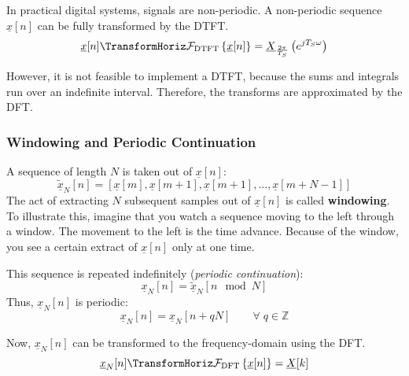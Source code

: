 \begin{refsection}
In practical digital systems, signals are non-periodic. A non-periodic sequence $\underline{x}[n]$ can be fully transformed by the \ac{DTFT}.
\begin{equation}
	\underline{x}[n] \TransformHoriz \mathcal{F}_{\text{DTFT}}\left\{\underline{x}[n]\right\} = \underline{X}_{\frac{2\pi}{T_S}}\left(e^{j T_S \omega}\right)
\end{equation}

However, it is not feasible to implement a \ac{DTFT}, because the sums and integrals run over an indefinite interval. Therefore, the transforms are approximated by the \ac{DFT}.

\subsubsection{Windowing and Periodic Continuation}

A sequence of length $N$ is taken out of $\underline{x}[n]$:
\begin{equation}
	\underline{\tilde{x}}_N[n] = \left[\underline{x}[m], \underline{x}[m+1], \underline{x}[m+1], \dots, \underline{x}[m+N-1]\right]
\end{equation}
The act of extracting $N$ subsequent samples out of $\underline{x}[n]$ is called  \textbf{windowing}. To illustrate this, imagine that you watch a sequence moving to the left through a window. The movement to the left is the time advance. Because of the window, you see a certain extract of $\underline{x}[n]$ only at one time.


This sequence is repeated indefinitely (\emph{periodic continuation}):
\begin{equation}
	\underline{x}_N[n] = \underline{\tilde{x}}_N[n \mod N]
\end{equation}
Thus, $\underline{x}_N[n]$ is periodic:
\begin{equation}
	\underline{x}_N[n] = \underline{x}_N[n + q N] \qquad \forall \; q \in \mathbb{Z}
\end{equation}

Now, $\underline{x}_N[n]$ can be transformed to the frequency-domain using the \ac{DFT}.
\begin{equation}
	\underline{x}_N[n] \TransformHoriz \mathcal{F}_{\text{DFT}}\left\{\underline{x}[n]\right\} = \underline{X}[k]
\end{equation}


\end{refsection}
